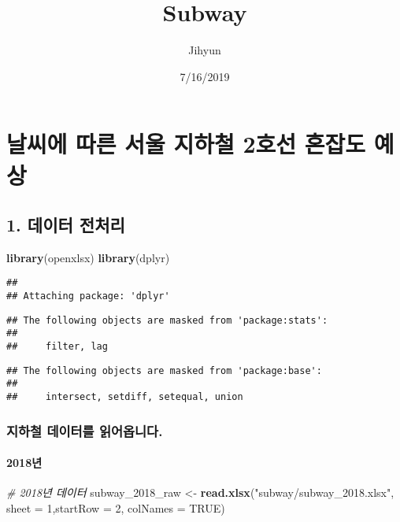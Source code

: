 \documentclass[]{article}
\title{Subway}
\author{Jihyun}
\date{7/16/2019}
\newenvironment{Shaded}{\begin{snugshade}}{\end{snugshade}}
\newcommand{\KeywordTok}[1]{\textcolor[rgb]{0.13,0.29,0.53}{\textbf{#1}}}
\newcommand{\DataTypeTok}[1]{\textcolor[rgb]{0.13,0.29,0.53}{#1}}
\newcommand{\DecValTok}[1]{\textcolor[rgb]{0.00,0.00,0.81}{#1}}
\newcommand{\StringTok}[1]{\textcolor[rgb]{0.31,0.60,0.02}{#1}}
\newcommand{\CommentTok}[1]{\textcolor[rgb]{0.56,0.35,0.01}{\textit{#1}}}
\newcommand{\OtherTok}[1]{\textcolor[rgb]{0.56,0.35,0.01}{#1}}
\newcommand{\NormalTok}[1]{#1}
\let\oldparagraph\paragraph
\renewcommand{\paragraph}[1]{\oldparagraph{#1}\mbox{}}
\begin{document}
\maketitle

\section{날씨에 따른 서울 지하철 2호선 혼잡도 예상}\label{----2--}

\subsection{1. 데이터 전처리}\label{-}

\begin{Shaded}
\begin{Highlighting}[]
\KeywordTok{library}\NormalTok{(openxlsx)}
\KeywordTok{library}\NormalTok{(dplyr)}
\end{Highlighting}
\end{Shaded}

\begin{verbatim}
## 
## Attaching package: 'dplyr'
\end{verbatim}

\begin{verbatim}
## The following objects are masked from 'package:stats':
## 
##     filter, lag
\end{verbatim}

\begin{verbatim}
## The following objects are masked from 'package:base':
## 
##     intersect, setdiff, setequal, union
\end{verbatim}

\subsubsection{지하철 데이터를 읽어옵니다.}\label{--.}

\paragraph{2018년}

\begin{Shaded}
\begin{Highlighting}[]
\CommentTok{# 2018년 데이터}
\NormalTok{subway_2018_raw <-}\StringTok{ }\KeywordTok{read.xlsx}\NormalTok{(}\StringTok{"subway/subway_2018.xlsx"}\NormalTok{, }\DataTypeTok{sheet =} \DecValTok{1}\NormalTok{,}\DataTypeTok{startRow =} \DecValTok{2}\NormalTok{, }\DataTypeTok{colNames =} \OtherTok{TRUE}\NormalTok{)}
\end{Highlighting}
\end{Shaded}
\end{document}
